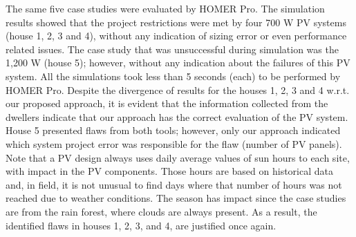 \documentclass[journal]{IEEEtran}
\begin{document}
The same five case studies were evaluated by HOMER Pro. The simulation results showed that the project restrictions were met by four 700 W PV systems (house 1, 2, 3 and 4), without any indication of sizing error or even performance related issues. The case study that was unsuccessful during simulation was the 1,200 W (house 5); however, without any indication about the failures of this PV system. All the simulations took less than 5 seconds (each) to be performed by HOMER Pro.
%
Despite the divergence of results for the houses 1, 2, 3 and 4 w.r.t. our proposed approach, it is evident that the information collected from the dwellers indicate that our approach has the correct evaluation of the PV system. House 5 presented flaws from both tools; however, only our approach indicated which system project error was responsible for the flaw (number of PV panels).
%
Note that a PV design always uses daily average values of sun hours to each site, with impact in the PV components. Those hours are based on historical data and, in field, it is not unusual to find days where that number of hours was not reached due to weather conditions. The season has impact since the case studies are from the rain forest, where clouds are always present. As a result, the identified flaws in houses 1, 2, 3, and 4, are justified once again.
%
%
\end{document}
